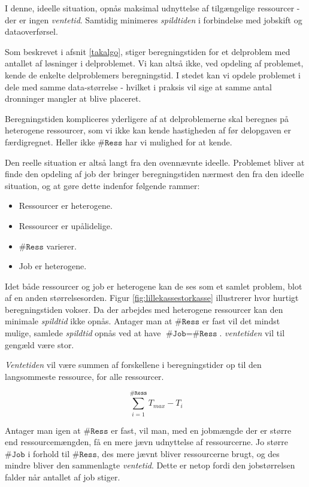 \documentclass[draft,a4paper,11pt]{article}
\begin{document}
I denne, ideelle situation, opnås maksimal udnyttelse af tilgængelige ressourcer - der er ingen \emph{ventetid}. Samtidig minimeres \emph{spildtiden} i forbindelse med jobskift og dataoverførsel.
 
Som beskrevet i afsnit \ref{takalgo}, stiger beregningstiden for et delproblem med antallet af løsninger i delproblemet. Vi kan altså ikke, ved opdeling af problemet, kende de enkelte delproblemers beregningstid. I stedet kan vi opdele problemet i dele med samme data-størrelse - hvilket i praksis vil sige at samme antal dronninger mangler at blive placeret. 

Beregningstiden kompliceres yderligere af at delproblemerne skal beregnes på heterogene ressourcer, som vi ikke kan kende hastigheden af før delopgaven er færdigregnet. Heller ikke $\texttt{\#Ress}$ har vi mulighed for at kende. 

Den reelle situation er altså langt fra den ovennævnte ideelle. Problemet bliver at finde den opdeling af job der bringer beregningstiden nærmest den fra den ideelle situation, og at gøre dette indenfor følgende rammer:
\begin{itemize}
	\item Ressourcer er heterogene.
	\item Ressourcer er upålidelige.
	\item $\texttt{\#Ress}$ varierer.
	\item Job er heterogene.
\end{itemize}

Idet både ressourcer og job er heterogene kan de ses som et samlet problem, blot af en anden størrelsesorden. Figur \ref{fig:lillekassestorkasse} illustrerer hvor hurtigt beregningstiden vokser.
Da der arbejdes med heterogene ressourcer kan den minimale \emph{spildtid} ikke opnås. 
Antager man at $\texttt{\#Ress}$ er fast vil det mindst mulige, samlede \emph{spildtid} opnås ved at have $\texttt{\#Job} = \texttt{\#Ress}$. \emph{ventetiden} vil til gengæld være stor. 

\emph{Ventetiden} vil være summen af forskellene i beregningstider op til den langsommeste ressource, for alle ressourcer.   
 
\begin{displaymath}
	\sum_{i=1}^{\texttt{\#Ress}} T_{max} - T_{i} 
\end{displaymath}

Antager man igen at $\texttt{\#Ress}$ er fast, vil man, med en jobmængde der er større end ressourcemængden, få en mere jævn udnyttelse af ressourcerne. Jo større $\texttt{\#Job}$ i forhold til $\texttt{\#Ress}$, des mere jævnt bliver ressourcerne brugt, og des mindre bliver den sammenlagte \emph{ventetid}. Dette er netop fordi den jobstørrelsen falder når antallet af job stiger. 
\end{document}
